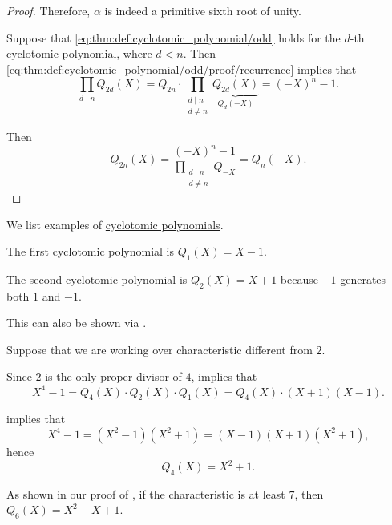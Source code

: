 \begin{proof}
  Therefore, \( \alpha \) is indeed a primitive sixth root of unity.

   Suppose that \eqref{eq:thm:def:cyclotomic_polynomial/odd} holds for the \( d \)-th cyclotomic polynomial, where \( d < n \). Then \eqref{eq:thm:def:cyclotomic_polynomial/odd/proof/recurrence} implies that
  \begin{equation*}
    \prod_{d \mid n} Q_{2d}(X) = Q_{2n} \cdot \prod_{\substack{d \mid n \\ d \neq n}} \underbrace{Q_{2d}(X)}_{Q_d(-X)} = (-X)^n - 1.
  \end{equation*}

  Then
  \begin{equation*}
    Q_{2n}(X) = \frac {(-X)^n - 1} {\displaystyle \prod_{\substack{d \mid n \\ d \neq n}} Q_{-X}} = Q_n(-X).
  \end{equation*}
\end{proof}

\begin{example}\label{ex:def:cyclotomic_polynomial}
  We list examples of \hyperref[def:cyclotomic_polynomial]{cyclotomic polynomials}.
  \begin{thmenum}
     The first cyclotomic polynomial is \( Q_1(X) = X - 1 \).

     The second cyclotomic polynomial is \( Q_2(X) = X + 1 \) because \( -1 \) generates both \( 1 \) and \( -1 \).

    This can also be shown via .

     Suppose that we are working over characteristic different from \( 2 \).

    Since \( 2 \) is the only proper divisor of \( 4 \),  implies that
    \begin{equation*}
      X^4 - 1 = Q_4(X) \cdot Q_2(X) \cdot Q_1(X) = Q_4(X) \cdot (X + 1) (X - 1).
    \end{equation*}

     implies that
    \begin{equation*}
      X^4 - 1 = (X^2 - 1) (X^2 + 1) = (X - 1) (X + 1) (X^2 + 1),
    \end{equation*}
    hence
    \begin{equation*}
      Q_4(X) = X^2 + 1.
    \end{equation*}

     As shown in our proof of , if the characteristic is at least \( 7 \), then \( Q_6(X) = X^2 - X + 1 \).
  \end{thmenum}
\end{example}

